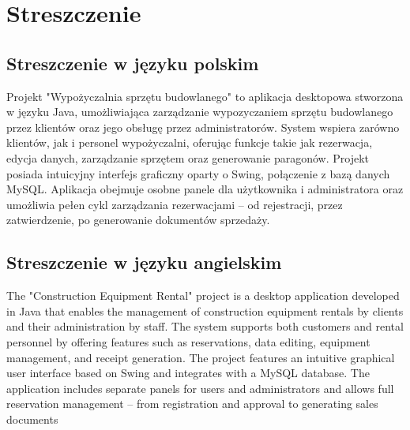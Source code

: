 \chapter{Streszczenie}
\label{cha:streszczenie}

\section{Streszczenie w języku polskim}
\label{sec:streszczeniePrac}

Projekt  "Wypożyczalnia sprzętu budowlanego" to aplikacja desktopowa stworzona w języku Java, umożliwiająca zarządzanie wypozyczaniem sprzętu budowlanego przez klientów oraz jego obsługę przez administratorów. System wspiera zarówno klientów, jak i personel wypożyczalni, oferując funkcje takie jak rezerwacja, edycja danych, zarządzanie sprzętem oraz generowanie paragonów. Projekt posiada intuicyjny interfejs graficzny oparty o Swing, połączenie z bazą danych MySQL. Aplikacja obejmuje osobne panele dla użytkownika i administratora oraz umożliwia pełen cykl zarządzania rezerwacjami – od rejestracji, przez zatwierdzenie, po generowanie dokumentów sprzedaży.


\section{Streszczenie w języku angielskim}
\label{sec:streszczeniePracyang}
The "Construction Equipment Rental" project is a desktop application developed in Java that enables the management of construction equipment rentals by clients and their administration by staff. The system supports both customers and rental personnel by offering features such as reservations, data editing, equipment management, and receipt generation. The project features an intuitive graphical user interface based on Swing and integrates with a MySQL database. The application includes separate panels for users and administrators and allows full reservation management – from registration and approval to generating sales documents
